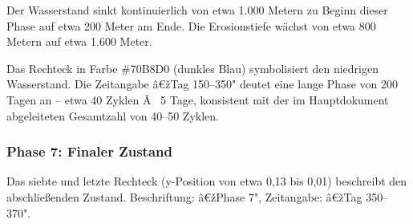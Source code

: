 Der Wasserstand sinkt kontinuierlich von etwa 1.000 Metern zu Beginn dieser Phase auf etwa 200 Meter am Ende. Die Erosionstiefe wächst von etwa 800 Metern auf etwa 1.600 Meter.

Das Rechteck in Farbe \#70B8D0 (dunkles Blau) symbolisiert den niedrigen Wasserstand. Die Zeitangabe â€žTag 150--350" deutet eine lange Phase von 200 Tagen an -- etwa 40 Zyklen Ã  5 Tage, konsistent mit der im Hauptdokument abgeleiteten Gesamtzahl von 40--50 Zyklen.

\subsubsection*{Phase 7: Finaler Zustand}

Das siebte und letzte Rechteck (y-Position von etwa 0,13 bis 0,01) beschreibt den abschließenden Zustand. Beschriftung: â€žPhase 7", Zeitangabe: â€žTag 350--370".

